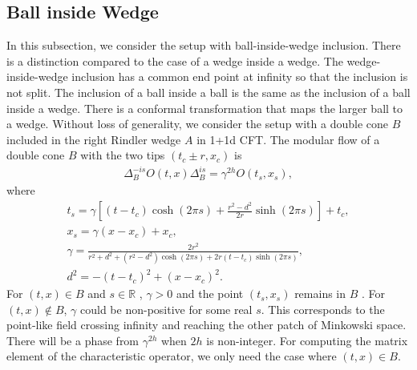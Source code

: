 \documentclass[a4paper,11pt]{article}
\theoremstyle{definition}
\begin{document}
\subsection{Ball inside Wedge}
In this subsection, we consider the setup with ball-inside-wedge inclusion. There is a distinction compared to the case of a wedge inside a wedge. The wedge-inside-wedge inclusion has a common end point at infinity so that the inclusion is not split. The inclusion of a ball inside a ball is the same as the inclusion of a ball inside a wedge. There is a conformal transformation that maps the larger ball to a wedge. Without loss of generality, we consider the setup with a double cone $B$ included in the right Rindler wedge $A$ in 1+1d CFT. The modular flow of a double cone $B$ with the two tips $(t_c\pm r,x_c)$ is
\begin{align}
    \Delta_B^{-is} O(t,x) \Delta_B^{is} = \gamma^{2h} O(t_s,x_s),
\end{align}
where
\begin{gather}
    t_s = \gamma \left[(t-t_c)\cosh(2\pi s) + \frac{r^2-d^2}{2r}\sinh(2\pi s)\right] + t_c,\\
    x_s = \gamma (x-x_c) + x_c,\\
    \gamma = \frac{2r^2}{r^2+d^2 + (r^2-d^2)\cosh(2\pi s) +2r(t-t_c)\sinh(2\pi s)}, \\
    d^2 = -(t-t_c)^2 + (x-x_c)^2.
\end{gather}
For $(t,x) \in B$ and $s\in \mathbb{R}$ , $\gamma>0$ and the point $(t_s,x_s)$ remains in $B$ . For $(t,x) \notin B$, $\gamma$ could be non-positive for some real $s$. This corresponds to the point-like field crossing infinity and reaching the other patch of Minkowski space. There will be a phase from $\gamma^{2h}$ when $2h$ is non-integer. For computing the matrix element of the characteristic operator, we only need the case where $(t,x) \in B$.
\end{document}
